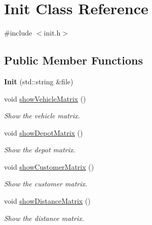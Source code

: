 \hypertarget{class_init}{}\section{Init Class Reference}
\label{class_init}


{\ttfamily \#include $<$init.\+h$>$}

\subsection*{Public Member Functions}
\begin{DoxyCompactItemize}
\item 
\mbox{\label{class_init_aae03d6a60f73f959014c6078fde9cd8c}} 
{\bfseries Init} (std\+::string \&file)
\item 
\mbox{\label{class_init_ac21ef408e896d9eceee8455fe51845b0}} 
void \hyperlink{class_init_ac21ef408e896d9eceee8455fe51845b0}{show\+Vehicle\+Matrix} ()
\begin{DoxyCompactList}\small\item\em Show the vehicle matrix. \end{DoxyCompactList}\item 
\mbox{\label{class_init_ae48e74d855e16384caf464dd27f6edee}} 
void \hyperlink{class_init_ae48e74d855e16384caf464dd27f6edee}{show\+Depot\+Matrix} ()
\begin{DoxyCompactList}\small\item\em Show the depot matrix. \end{DoxyCompactList}\item 
\mbox{\label{class_init_a977b73b6cde475c66a77da062a4fb847}} 
void \hyperlink{class_init_a977b73b6cde475c66a77da062a4fb847}{show\+Customer\+Matrix} ()
\begin{DoxyCompactList}\small\item\em Show the customer matrix. \end{DoxyCompactList}\item 
\mbox{\label{class_init_a6a0c2ee0902aba32df707db9bce7d1d5}} 
void \hyperlink{class_init_a6a0c2ee0902aba32df707db9bce7d1d5}{show\+Distance\+Matrix} ()
\begin{DoxyCompactList}\small\item\em Show the distance matrix. \end{DoxyCompactList}\item 

\end{DoxyCompactItemize}
